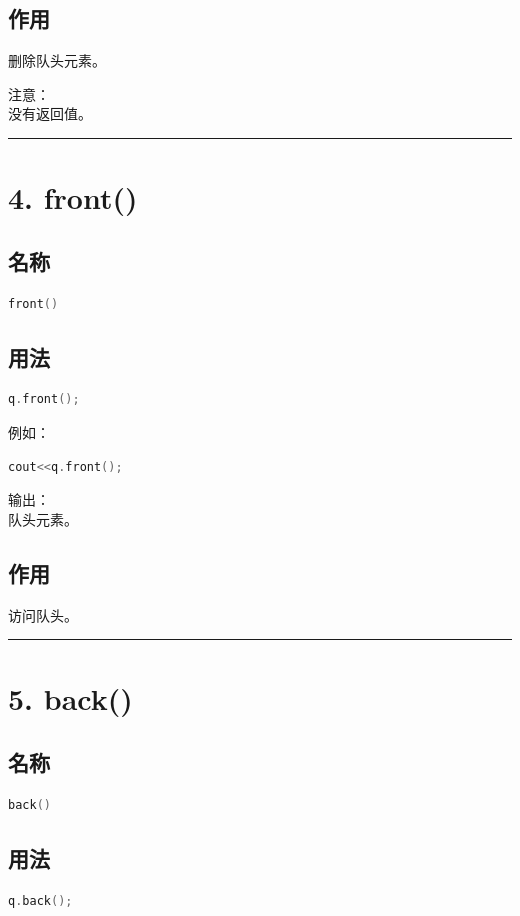 \documentclass[9pt,twocolumn]{extarticle}
\begin{document}
\subsection{作用}
删除队头元素。

注意：\\
没有返回值。

\noindent\rule{\linewidth}{0.4pt}

\section{4. front()}

\subsection{名称}
\begin{lstlisting}[language=C++]
front()
\end{lstlisting}

\subsection{用法}
\begin{lstlisting}[language=C++]
q.front();
\end{lstlisting}
例如：
\begin{lstlisting}[language=C++]
cout<<q.front();
\end{lstlisting}
输出：\\
队头元素。

\subsection{作用}
访问队头。

\noindent\rule{\linewidth}{0.4pt}

\section{5. back()}

\subsection{名称}
\begin{lstlisting}[language=C++]
back()
\end{lstlisting}

\subsection{用法}
\begin{lstlisting}[language=C++]
q.back();
\end{lstlisting}
\end{document}
